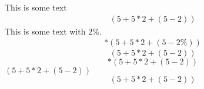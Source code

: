 This is some text
\begin{align}\label{equ1(good)}%
\left(5+5*2+\left(5-2\right)\right)%
\end{align}
This is some text with 2\%.
\begin{align}*
\left(5+5*2+\left(5-2\%\right)\right)
\end{align}
\begin{equation}\label{equ2(good)}
\left(5+5*2+\left(5-2\right)\right)%
\end{equation}
\begin{equation}*
\left(5+5*2+\left(5-2\right)\right)
\end{equation}
\(\left(5+5*2+\left(5-2\right)\right)\)
\[\left(5+5*2+\left(5-2\right)\right)\]
